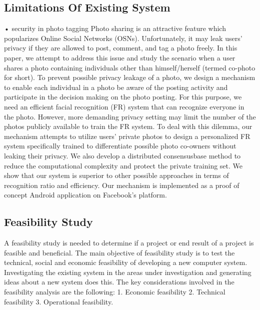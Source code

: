 \documentclass[a4paper,12pt]{article}
\begin{document}
\subsection{Limitations Of Existing System}
\hspace{5mm}
• security in photo tagging
Photo sharing is an attractive feature which popularizes Online Social Networks (OSNs). Unfortunately, it may leak users’ privacy if they are allowed to post, comment, and tag a photo freely. In this paper, we attempt to address this issue and study the scenario when a user shares a photo containing individuals other than himself/herself (termed co-photo for short). To prevent possible privacy leakage of a photo, we design a mechanism to enable each individual in a photo be aware of the posting activity and participate in the decision making on the photo posting. For this purpose, we need an efficient facial recognition (FR) system that can recognize everyone in the photo. However, more demanding privacy setting may limit the number of the photos publicly available to train the FR system. To deal with this dilemma, our mechanism attempts to utilize users’ private photos to design a personalized FR system specifically trained to differentiate possible photo co-owners without leaking their privacy. We also develop a distributed consensusbase method to reduce the computational complexity and protect the private training set. We show that our system is superior to other possible approaches in terms of recognition ratio and efficiency. Our mechanism is implemented as a proof of concept Android application on Facebook’s platform.
\newpage
\subsection{Feasibility Study}
\hspace{5mm}
       A feasibility study is needed to determine if a project or end result of a project is feasible and beneficial. The main objective of feasibility study is to test the technical, social and economic feasibility of developing a new computer system. Investigating the existing system in the areas under investigation and generating ideas about a new system does this. 
      The key considerations involved in the feasibility analysis are the following:
1.	Economic feasibility
2.	Technical feasibility
3.	Operational feasibility.
\end{document}
